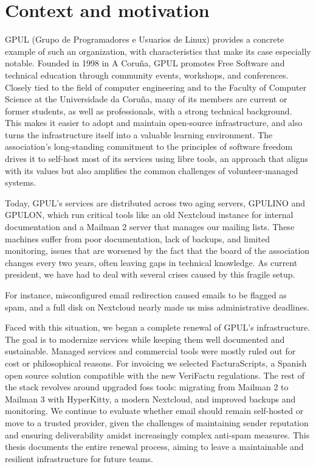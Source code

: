 \section{Context and motivation}

GPUL (Grupo de Programadores e Usuarios de Linux) \cite{gpul-web} provides a concrete example of such an organization, with characteristics that make its case especially notable. Founded in 1998 in A Coruña, GPUL promotes Free Software and technical education through community events, workshops, and conferences. Closely tied to the field of computer engineering and to the Faculty of Computer Science at the Universidade da Coruña, many of its members are current or former students, as well as professionals, with a strong technical background. This makes it easier to adopt and maintain open-source infrastructure, and also turns the infrastructure itself into a valuable learning environment. The association's long-standing commitment to the principles of software freedom drives it to self-host most of its services using libre tools, an approach that aligns with its values but also amplifies the common challenges of volunteer-managed systems.

Today, GPUL's services are distributed across two aging servers, GPULINO and GPULON, which run critical tools like an old Nextcloud instance for internal documentation and a Mailman 2 server that manages our mailing lists. These machines suffer from poor documentation, lack of backups, and limited monitoring, issues that are worsened by the fact that the board of the association changes every two years, often leaving gaps in technical knowledge. As current president, we have had to deal with several crises caused by this fragile setup.

For instance, misconfigured email redirection caused emails to be flagged as spam, and a full disk on Nextcloud nearly made us miss administrative deadlines.

Faced with this situation, we began a complete renewal of GPUL's infrastructure. The goal is to modernize services while keeping them well documented and sustainable. Managed services and commercial tools were mostly ruled out for cost or philosophical reasons. For invoicing we selected FacturaScripts\cite{facturascripts-antifraude}, a Spanish open source solution compatible with the new VeriFactu regulations\cite{boe-a-2024-22138}. The rest of the stack revolves around upgraded \gls{foss} tools: migrating from Mailman 2 to Mailman 3 with HyperKitty\cite{hyperkitty-web}, a modern Nextcloud, and improved backups and monitoring. We continue to evaluate whether email should remain self-hosted or move to a trusted provider, given the challenges of maintaining sender reputation and ensuring deliverability amidst increasingly complex anti-spam measures. This thesis documents the entire renewal process, aiming to leave a maintainable and resilient infrastructure for future teams.

